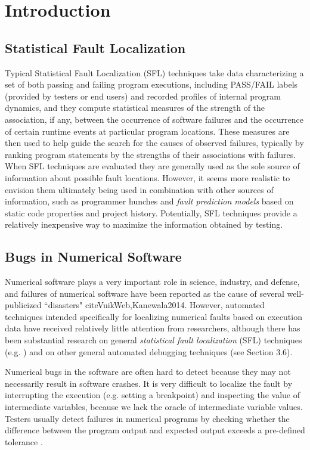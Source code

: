 \chapter{Introduction}\label{chap:introduction}
\section{Statistical Fault Localization}
Typical Statistical Fault Localization (SFL) techniques take data characterizing a set of both passing and failing program executions, including PASS/FAIL labels (provided by testers or end users) and recorded profiles of internal program dynamics, and they compute statistical measures of the strength of the association, if any, between the occurrence of software failures and the occurrence of certain runtime events at particular program locations.  These measures are then used to help guide the search for the causes of observed failures, typically by ranking program statements by the strengths of their associations with failures.  When SFL techniques are evaluated they are generally used as the sole source of information about possible fault locations.  However, it seems more realistic to envision them ultimately being used in combination with other sources of information, such as programmer hunches and {\it fault prediction models} \cite{Fenton1999} based on static code properties and project history.  Potentially, SFL techniques provide a relatively inexpensive way to maximize the information obtained by testing.


\section{Bugs in Numerical Software}
Numerical software plays a very important role in science, industry, and defense, and failures of numerical software have been reported as the cause of several well-publicized ``disasters" cite{VuikWeb,Kanewala2014}.  However, automated techniques intended specifically for localizing numerical faults based on execution data have received relatively little attention from researchers, although there has been substantial research on general {\it statistical fault localization} (SFL) techniques (e.g. \cite{Jones2002,Liblit2004,Liu2005}) and on other general automated debugging techniques (see Section 3.6).

Numerical bugs in the software are often hard to detect because they may not necessarily result in software crashes. It is very difficult to localize the fault by interrupting the execution (e.g. setting a breakpoint) and inspecting the value of intermediate variables, because we lack the oracle of intermediate variable values. Testers usually detect failures in numerical programs by checking whether the difference between the program output and expected output exceeds a pre-defined tolerance \cite{commontest}.

